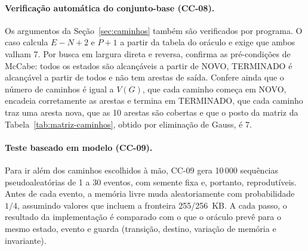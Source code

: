 \documentclass[11pt,a4paper]{article}
\theoremstyle{definition}
\newcommand{\est}[1]{\textsf{\small #1}}   %
\newcommand{\VG}{V(G)}
\begin{document}
\paragraph{Verificação automática do conjunto-base (CC-08).} Os argumentos da
Seção~\ref{sec:caminhos} também são verificados por programa. O caso calcula $E - N + 2$ e $P + 1$ a
partir da tabela do oráculo e exige que ambos valham 7. Por busca em largura direta e reversa,
confirma as pré-condições de McCabe: todos os estados são alcançáveis a partir de \est{NOVO},
\est{TERMINADO} é alcançável a partir de todos e não tem arestas de saída. Confere ainda que o
número de caminhos é igual a $\VG$, que cada caminho começa em \est{NOVO}, encadeia corretamente as
arestas e termina em \est{TERMINADO}, que cada caminho traz uma aresta nova, que as 10 arestas são
cobertas e que o posto da matriz da Tabela~\ref{tab:matriz-caminhos}, obtido por eliminação de
Gauss, é 7.

\paragraph{Teste baseado em modelo (CC-09).} Para ir além dos caminhos escolhidos à mão, CC-09 gera
10\,000 sequências pseudoaleatórias de 1 a 30 eventos, com semente fixa e, portanto,
reprodutíveis. Antes de cada evento, a memória livre muda aleatoriamente com probabilidade $1/4$,
assumindo valores que incluem a fronteira 255/256~KB. A cada passo, o resultado da implementação é
comparado com o que o oráculo prevê para o mesmo estado, evento e guarda (transição, destino,
variação de memória e invariante).
\end{document}
